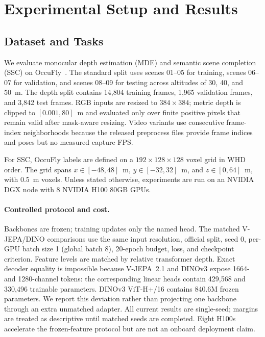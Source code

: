 \newcommand{\fsscrgbdirect}{FSSC RGB ctx DPT, depth FiLM-DPT}
\newcommand{\fsscrgbfilm}{FSSC RGB ctx FiLM-DPT, depth FiLM-DPT}
\newcommand{\fsscvidmvs}{FSSC video ctx DTA-DPT, depth DTA-MVS}
\newcommand{\fsscvidfilmmvs}{FSSC video ctx DTA-DPT, depth DTA-FiLM-MVS}

\section{Experimental Setup and Results}

\subsection{Dataset and Tasks}
We evaluate monocular depth estimation (MDE) and semantic scene completion (SSC) on OccuFly~\cite{gross2026occufly}. The standard split uses scenes 01--05 for training, scenes 06--07 for validation, and scenes 08--09 for testing across altitudes of 30, 40, and 50~m. The depth split contains 14,804 training frames, 1,965 validation frames, and 3,842 test frames. RGB inputs are resized to $384\times384$; metric depth is clipped to $[0.001,80]$~m and evaluated only over finite positive pixels that remain valid after mask-aware resizing. Video variants use consecutive frame-index neighborhoods because the released preprocess files provide frame indices and poses but no measured capture FPS.

For SSC, OccuFly labels are defined on a $192\times128\times128$ voxel grid in WHD order. The grid spans $x\in[-48,48]$~m, $y\in[-32,32]$~m, and $z\in[0,64]$~m, with 0.5~m voxels. Unless stated otherwise, experiments are run on an NVIDIA DGX node with 8 NVIDIA H100 80GB GPUs.

\paragraph{Controlled protocol and cost.}
Backbones are frozen; training updates only the named head. The matched V-JEPA/DINO comparisons use the same input resolution, official split, seed 0, per-GPU batch size 1 (global batch 8), 20-epoch budget, loss, and checkpoint criterion. Feature levels are matched by relative transformer depth. Exact decoder equality is impossible because V-JEPA~2.1 and DINOv3 expose 1664- and 1280-channel tokens: the corresponding linear heads contain 429,568 and 330,496 trainable parameters. DINOv3 ViT-H+/16 contains 840.6M frozen parameters. We report this deviation rather than projecting one backbone through an extra unmatched adapter. All current results are single-seed; margins are treated as descriptive until matched seeds are completed. Eight H100s accelerate the frozen-feature protocol but are not an onboard deployment claim.

